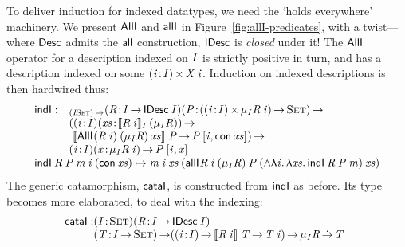 To deliver induction for indexed datatypes, we need the `holds everywhere'
machinery. We present $\SYMBAllI$ and $\SYMBallI$ in
Figure~\ref{fig:allI-predicates}, with a twist---where
$\Desc$ admits the $\SYMBall$ construction, $\SYMBIDesc$ is \emph{closed}
under it! The $\SYMBAllI$
operator for a description indexed on \(\V{I}\) is strictly positive in
turn, and has a description indexed on
 some \(\SIGMA{\V{i}}{\V{I}}{\V{X}\: \V{i}}\).
Induction on indexed descriptions is then hardwired thus:
%
\[\stk{
\begin{array}{@{}ll}
\inductionI : & _{\PI{\V{I}}{\Set}}
                   \PITEL{\V{R}}{\V{I} \To \IDesc{\V{I}}}
                   \PI{\V{P}}{(\SIGMA{\V{i}}{\V{I}}{\IMu{\V{I}}{\V{R}}{\V{i}}}) \To \Set} \\
                 & (      \PITEL{\V{i}}{\V{I}} 
                          \PI{\V{xs}}{\idescop{\V{R}\: \V{i}}{\V{I}}{(\SYMBIMu_{\V{I}}{\V{R}})}} \\
                 & \   \idescop{\AllI{}
                                     {(\V{R}\: \V{i})}
                                     {(\SYMBIMu_{\V{I}}{\V{R}})}
                                     {\V{xs}}}
                               {}
                               {\V{P}} \To
                       \V{P}\: \pair{\V{i}}{\Con{\V{xs}}}{}) \To \\
                 & \PITEL{\V{i}}{\V{I}}
                   \PI{\V{x}}{\IMu{\V{I}}{\V{R}}{\V{i}}}
                   \V{P}\: \pair{\V{i}}{\V{x}}{}
\end{array} \\
\inductionI\: \V{R}\: \V{P}\: \V{m}\: \V{i}\: (\Con{\V{xs}}) \mapsto 
    \V{m}\: \V{i}\: \V{xs}\: (\allI{}
                                    {\V{R}\: \V{i}}
                                    {(\SYMBIMu_{\V{I}}{\V{R}})}
                                    {\V{P}}
                                    {(\spl{\LAM{\V{i}}\LAM{\V{xs}} \inductionI\: \V{R}\: \V{P}\: \V{m}})}
                                    {\V{xs}})
}\]
%
The generic catamorphism, $\cataI$, is constructed from $\inductionI$
as before. Its type becomes more elaborated, to deal with the
indexing:
%
\[
\begin{array}{@{}l@{}l}
\cataI :& \PITEL{\V{I}}{\Set}
          \PITEL{\V{R}}{\V{I} \To \IDesc{\V{I}}} \\
        & \PI{\V{T}}{\V{I} \To \Set}
          (\PI{\V{i}}{\V{I}}{\idescop{\V{R}\: \V{i}}{}{\V{T}} \To \V{T}\: \V{i}}) \To
          \SYMBIMu_{\V{I}}{\V{R}} \DotTo \V{T}
\end{array}
\]


